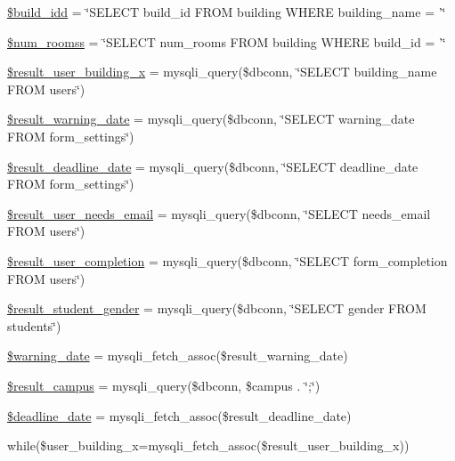 \begin{DoxyCompactItemize}
\item 
\hyperlink{index_8php_a6671599aee303444a6ccd2d2226630dd}{\$build\-\_\-idd} = \char`\"{}\-S\-E\-L\-E\-C\-T build\-\_\-id \-F\-R\-O\-M building \-W\-H\-E\-R\-E building\-\_\-name = '\char`\"{}
\item 
\hyperlink{index_8php_a042bc70123c1cedbe0ebc14950c86267}{\$num\-\_\-roomss} = \char`\"{}\-S\-E\-L\-E\-C\-T num\-\_\-rooms \-F\-R\-O\-M building \-W\-H\-E\-R\-E build\-\_\-id = '\char`\"{}
\item 
\hyperlink{index_8php_ac87f45c9f62c3f0628eef67281f382b3}{\$result\-\_\-user\-\_\-building\-\_\-x} = mysqli\-\_\-query(\$dbconn, \char`\"{}\-S\-E\-L\-E\-C\-T building\-\_\-name \-F\-R\-O\-M users\char`\"{})
\item 
\hyperlink{index_8php_a4cb926b56b2c25912bf67859aacab6d4}{\$result\-\_\-warning\-\_\-date} = mysqli\-\_\-query(\$dbconn, \char`\"{}\-S\-E\-L\-E\-C\-T warning\-\_\-date \-F\-R\-O\-M form\-\_\-settings\char`\"{})
\item 
\hyperlink{index_8php_ad61a3f443fc1856c2ba99dfde9affc8c}{\$result\-\_\-deadline\-\_\-date} = mysqli\-\_\-query(\$dbconn, \char`\"{}\-S\-E\-L\-E\-C\-T deadline\-\_\-date \-F\-R\-O\-M form\-\_\-settings\char`\"{})
\item 
\hyperlink{index_8php_aafa48812b4607e55b823158f58b39185}{\$result\-\_\-user\-\_\-needs\-\_\-email} = mysqli\-\_\-query(\$dbconn, \char`\"{}\-S\-E\-L\-E\-C\-T needs\-\_\-email \-F\-R\-O\-M users\char`\"{})
\item 
\hyperlink{index_8php_a0acda6e82914708d1666c0f04deacbfb}{\$result\-\_\-user\-\_\-completion} = mysqli\-\_\-query(\$dbconn, \char`\"{}\-S\-E\-L\-E\-C\-T form\-\_\-completion \-F\-R\-O\-M users\char`\"{})
\item 
\hyperlink{index_8php_adff53f8f2492a44a21e49f4a86980b2e}{\$result\-\_\-student\-\_\-gender} = mysqli\-\_\-query(\$dbconn, \char`\"{}\-S\-E\-L\-E\-C\-T gender \-F\-R\-O\-M students\char`\"{})
\item 
\hyperlink{index_8php_a6e9f4ec234df3b3983352f341b57f8ba}{\$warning\-\_\-date} = mysqli\-\_\-fetch\-\_\-assoc(\$result\-\_\-warning\-\_\-date)
\item 
\hyperlink{index_8php_afdd2ad9cb7726ebdf33d1095eac78a1a}{\$result\-\_\-campus} = mysqli\-\_\-query(\$dbconn, \$campus . \char`\"{};\char`\"{})
\item 
\hyperlink{index_8php_af9a17edb1f4ed37105db8233956d2287}{\$deadline\-\_\-date} = mysqli\-\_\-fetch\-\_\-assoc(\$result\-\_\-deadline\-\_\-date)
\item 
while(\$user\-\_\-building\-\_\-x=mysqli\-\_\-fetch\-\_\-assoc(\$result\-\_\-user\-\_\-building\-\_\-x)) \*

\end{DoxyCompactItemize}
